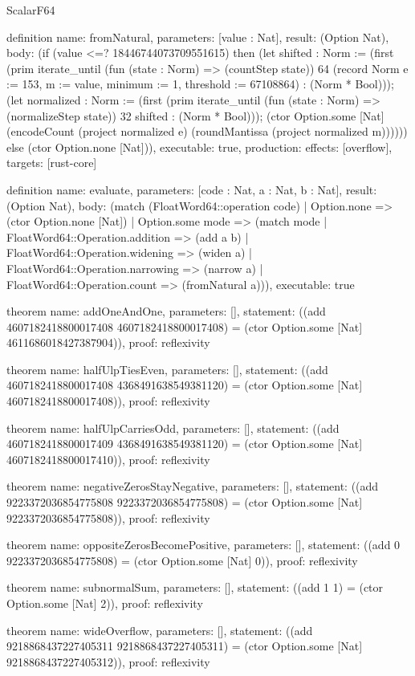 \begin{lexlean}{ScalarF64}
\begin{semanticmodule}
definition{
  name: fromNatural,
  parameters: [value : Nat],
  result: (Option Nat),
  body: (if (value <=? 18446744073709551615) then (let shifted : Norm := (first (prim iterate_until (fun (state : Norm) => (countStep state)) 64 (record Norm {e := 153, m := value, minimum := 1, threshold := 67108864}) : (Norm * Bool))); (let normalized : Norm := (first (prim iterate_until (fun (state : Norm) => (normalizeStep state)) 32 shifted : (Norm * Bool))); (ctor Option.some [Nat] (encodeCount (project normalized e) (roundMantissa (project normalized m)))))) else (ctor Option.none [Nat])),
  executable: true,
  production: {effects: [overflow], targets: [rust-core]}
}

definition{
  name: evaluate,
  parameters: [code : Nat, a : Nat, b : Nat],
  result: (Option Nat),
  body: (match (FloatWord64::operation code)
    | Option.none => (ctor Option.none [Nat])
    | Option.some mode => (match mode
      | FloatWord64::Operation.addition => (add a b)
      | FloatWord64::Operation.widening => (widen a)
      | FloatWord64::Operation.narrowing => (narrow a)
      | FloatWord64::Operation.count => (fromNatural a))),
  executable: true
}

theorem{
  name: addOneAndOne,
  parameters: [],
  statement: ((add 4607182418800017408 4607182418800017408) = (ctor Option.some [Nat] 4611686018427387904)),
  proof: reflexivity{}
}

theorem{
  name: halfUlpTiesEven,
  parameters: [],
  statement: ((add 4607182418800017408 4368491638549381120) = (ctor Option.some [Nat] 4607182418800017408)),
  proof: reflexivity{}
}

theorem{
  name: halfUlpCarriesOdd,
  parameters: [],
  statement: ((add 4607182418800017409 4368491638549381120) = (ctor Option.some [Nat] 4607182418800017410)),
  proof: reflexivity{}
}

theorem{
  name: negativeZerosStayNegative,
  parameters: [],
  statement: ((add 9223372036854775808 9223372036854775808) = (ctor Option.some [Nat] 9223372036854775808)),
  proof: reflexivity{}
}

theorem{
  name: oppositeZerosBecomePositive,
  parameters: [],
  statement: ((add 0 9223372036854775808) = (ctor Option.some [Nat] 0)),
  proof: reflexivity{}
}

theorem{
  name: subnormalSum,
  parameters: [],
  statement: ((add 1 1) = (ctor Option.some [Nat] 2)),
  proof: reflexivity{}
}

theorem{
  name: wideOverflow,
  parameters: [],
  statement: ((add 9218868437227405311 9218868437227405311) = (ctor Option.some [Nat] 9218868437227405312)),
  proof: reflexivity{}
}


\end{semanticmodule}
\end{lexlean}
